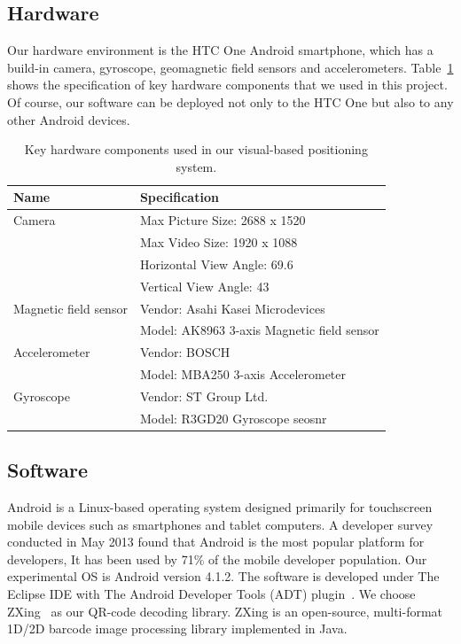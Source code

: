 \subsection{Hardware}
Our hardware environment is the HTC One Android smartphone, which has a build-in camera, gyroscope, geomagnetic field sensors and accelerometers.
Table~\ref{tb-key-hardware} shows the specification of key hardware components that we used in this project. Of course, our software can be deployed not only to the HTC One but also to any other Android devices.
\begin{table}
\begin{center}
    \begin{tabular}{ | l | l |}
    \hline
    Name & Specification \\ \hline\hline
    Camera & Max Picture Size: 2688 x 1520 \\
    & Max Video Size: 1920 x 1088 \\
    & Horizontal View Angle: 69.6 \\
    &Vertical View Angle: 43 \\ \hline
    Magnetic field sensor & Vendor: Asahi Kasei Microdevices \\
    & Model: AK8963 3-axis Magnetic field sensor \\ \hline
    Accelerometer & Vendor: BOSCH \\
    & Model: MBA250 3-axis Accelerometer \\ \hline
    Gyroscope & Vendor: ST Group Ltd. \\
    & Model: R3GD20 Gyroscope seosnr \\ \hline
    \end{tabular}
\end{center}
\caption{Key hardware components used in our visual-based positioning system.}\label{tb-key-hardware}
\end{table}

\subsection{Software}
Android is a Linux-based operating system designed primarily for touchscreen mobile devices such as smartphones and tablet computers. A developer survey conducted in May 2013 found that Android is the most popular platform for developers, It has been used by 71\% of the mobile developer population. Our experimental OS is Android version 4.1.2. The software is developed under The Eclipse IDE with The Android Developer Tools (ADT) plugin~\cite{developers2013adt}.
We choose ZXing~\cite{mackintosh2012zxing} as our QR-code decoding library. ZXing is an open-source, multi-format 1D/2D barcode image processing library implemented in Java.

